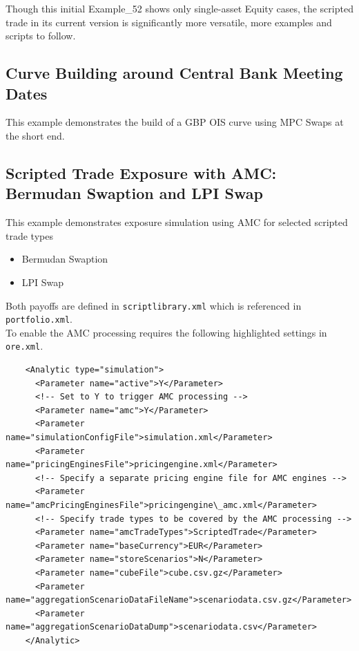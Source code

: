 \documentclass[12pt, a4paper]{article}
\begin{document}
Though this initial Example\_52 shows only single-asset Equity cases, the scripted trade in its current version is
  significantly more versatile, more examples and scripts to follow.

\subsection{Curve Building around Central Bank Meeting Dates}%
\label{example:53}

This example demonstrates the build of a GBP OIS curve using MPC Swaps at the short end.

\subsection{Scripted Trade Exposure with AMC: Bermudan Swaption and LPI Swap}%
\label{example:54}

This example demonstrates exposure simulation using AMC for selected scripted trade types
\begin{itemize}
\item Bermudan Swaption
\item LPI Swap
\end{itemize}
Both payoffs are defined in {\tt scriptlibrary.xml} which is referenced in {\tt portfolio.xml}. \\

To enable the AMC processing requires the following highlighted settings in {\tt ore.xml}.

\begin{verbatim}
    <Analytic type="simulation">
      <Parameter name="active">Y</Parameter>
      <!-- Set to Y to trigger AMC processing -->
      <Parameter name="amc">Y</Parameter>
      <Parameter name="simulationConfigFile">simulation.xml</Parameter>
      <Parameter name="pricingEnginesFile">pricingengine.xml</Parameter>
      <!-- Specify a separate pricing engine file for AMC engines -->
      <Parameter name="amcPricingEnginesFile">pricingengine\_amc.xml</Parameter>
      <!-- Specify trade types to be covered by the AMC processing -->
      <Parameter name="amcTradeTypes">ScriptedTrade</Parameter>
      <Parameter name="baseCurrency">EUR</Parameter>
      <Parameter name="storeScenarios">N</Parameter>
      <Parameter name="cubeFile">cube.csv.gz</Parameter>
      <Parameter name="aggregationScenarioDataFileName">scenariodata.csv.gz</Parameter>
      <Parameter name="aggregationScenarioDataDump">scenariodata.csv</Parameter>
    </Analytic>
\end{verbatim}
\end{document}
